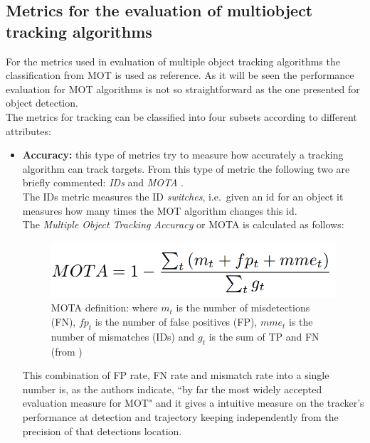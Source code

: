 \subsection{Metrics for the evaluation of multiobject tracking algorithms}
For the metrics used in evaluation of multiple object tracking algorithms the classification from MOT \cite{milan2016mot16} is used as reference. As it will be seen the performance evaluation for MOT algorithms is not so straightforward as the one presented for object detection.\\
The metrics for tracking can be classified into four subsets according to different attributes:
\begin{itemize}
    \item \textbf{Accuracy:} this type of metrics try to measure how accurately a tracking algorithm can track targets. From this type of metric the following two are briefly commented: \textit{IDs} \cite{yamaguchi2011you} and \textit{MOTA} \cite{bernardin2008evaluating}.\\ The IDs metric measures the ID \textit{switches}, i.e.\ given an id for an object it measures how many times the MOT algorithm changes this id.\\ The \textit{Multiple Object Tracking Accuracy} or MOTA is calculated as follows:
    \begin{figure}[H]
    \begin{center}
    \includegraphics[scale=0.3]{figures/mota.png}
    \caption{MOTA definition: where $m_t$ is the number of misdetections (FN), $fp_t$ is the number of false positives (FP), $mme_t$ is the number of mismatches (IDs) and $g_t$ is the sum of TP and FN (from \cite{bernardin2008evaluating})}
    \label{fig:mota}
    \end{center}
    \end{figure}
    This combination of FP rate, FN rate and mismatch rate into a single number is, as the authors indicate, ``by far the most widely accepted evaluation measure for MOT" \cite{milan2016mot16} and it gives a intuitive measure on the tracker's performance at detection and trajectory keeping independently from the precision of that detections location.


\end{itemize}
